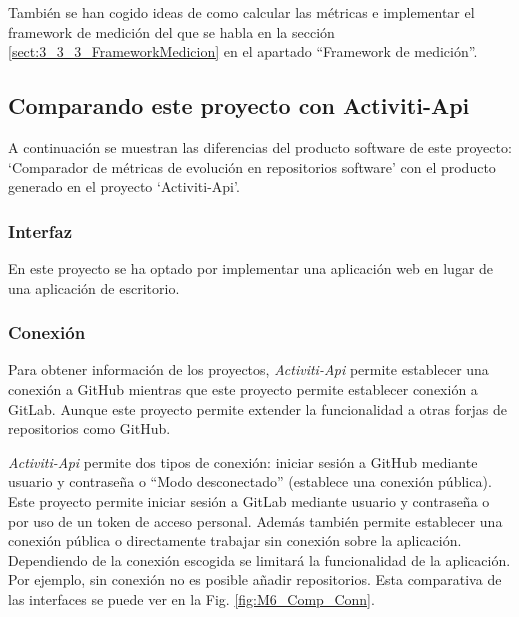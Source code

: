 
También se han cogido ideas de como calcular las métricas e implementar el framework de medición del que se habla en la sección \ref{sect:3_3_3_FrameworkMedicion} en el apartado ``Framework de medición''.

\subsection{Comparando este proyecto con Activiti-Api}

A continuación se muestran las diferencias del producto software de este proyecto: `Comparador de métricas de evolución en repositorios software' con el producto generado en el proyecto `Activiti-Api'.

\subsubsection{Interfaz}

En este proyecto se ha optado por implementar una aplicación web en lugar de una aplicación de escritorio.

\subsubsection{Conexión}

Para obtener información de los proyectos, \textit{Activiti-Api} permite establecer una conexión a GitHub mientras que este proyecto permite establecer conexión a GitLab. Aunque este proyecto permite extender la funcionalidad a otras forjas de repositorios como GitHub.

\textit{Activiti-Api} permite dos tipos de conexión: iniciar sesión a GitHub mediante usuario y contraseña o ``Modo desconectado'' (establece una conexión pública). Este proyecto permite iniciar sesión a GitLab mediante usuario y contraseña o por uso de un token de acceso personal. Además también permite establecer una conexión pública o directamente trabajar sin conexión sobre la aplicación. Dependiendo de la conexión escogida se limitará la funcionalidad de la aplicación. Por ejemplo, sin conexión no es posible añadir repositorios. Esta comparativa de las interfaces se puede ver en la Fig. \ref{fig:M6_Comp_Conn}.

